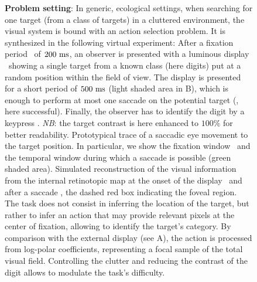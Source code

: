 \begin{figure}[t!]%
	\caption{%
		{\bf Problem setting}: In generic, ecological settings, when searching for one target (from a class of targets) in a cluttered environment, the visual system is bound with an action selection problem. It is synthesized in the following virtual experiment: %
		\A After a fixation period \FIX\ of $200~\si{\milli\second}$, an observer is presented with a luminous display \DIS\ showing a single target from a known class (here digits) put at a random position within the field of view. The display is presented for a short period of $500~\si{\milli\second}$ (light shaded area in B), which is enough to perform at most one saccade on the potential target (\SAC , here successful). Finally, the observer has to identify the digit by a keypress \ANS. \emph{NB}: the target contrast is here enhanced to $100\%$ for better readability. %
		\B Prototypical trace of a saccadic eye movement to the target position. In particular, we show the fixation window \FIX\ and the temporal window during which a saccade is possible (green shaded area). %
		\C Simulated reconstruction of the visual information from the internal retinotopic map at the onset of the display \DIS\ and after a saccade \SAC , the dashed red box indicating the foveal region. The task does not consist in inferring the location of the target, but rather to infer an action that may provide relevant pixels at the center of fixation, allowing to identify the target's category. By comparison with the external display (see A), the action is processed from log-polar coefficients, representing a focal sample of the total visual field.
		Controlling the clutter and reducing the contrast of the digit allows to modulate the task's difficulty.
		 }%
	\label{fig:intro} %
\end{figure}%

